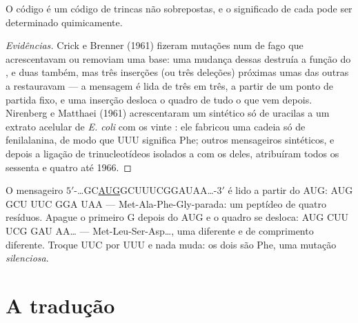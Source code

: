 \begin{proposition}\label{prop:b1:gene-expression:nirenberg}
O código é um código de trincas não sobrepostas, e o significado de cada
 pode ser determinado quimicamente.
\end{proposition}
\begin{proof}[Evidências]
Crick e Brenner (1961) fizeram mutações num  de fago que
acrescentavam ou removiam uma base: uma mudança dessas destruía a função
do , e duas também, mas três inserções (ou três deleções) próximas
umas das outras a restauravam --- a mensagem é lida de três em três, a
partir de um ponto de partida fixo, e uma inserção desloca o quadro de
tudo o que vem depois. Nirenberg e Matthaei (1961) acrescentaram um 
sintético só de uracilas a um extrato acelular de \emph{E. coli} com os
vinte : ele fabricou uma cadeia só de fenilalanina, de modo
que UUU significa Phe; outros mensageiros sintéticos, e depois a ligação
de trinucleotídeos isolados a  com os 
deles, atribuíram todos os sessenta e quatro até 1966.
\end{proof}

\begin{example}\label{ex:b1:gene-expression:reading}
O mensageiro $5'$-\ldots{}GC\underline{AUG}GCUUUCGGAUAA\ldots{}-$3'$ é
lido a partir do AUG: AUG GCU UUC GGA UAA --- Met-Ala-Phe-Gly-parada:
um peptídeo de quatro resíduos. Apague o primeiro G depois do AUG e o
quadro se desloca: AUG CUU UCG GAU AA\ldots{} --- Met-Leu-Ser-Asp\ldots,
uma  diferente e de comprimento diferente. Troque UUC por UUU e
nada muda: os dois são Phe, uma mutação \emph{silenciosa}.
\end{example}

\section{A tradução}

